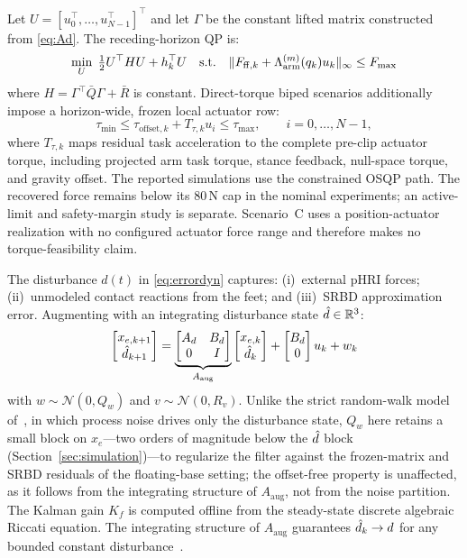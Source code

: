 Let $U=[u_0^\top,\ldots,u_{N-1}^\top]^\top$ and let $\Gamma$ be the
constant lifted matrix constructed from \eqref{eq:Ad}.
The receding-horizon QP is:
\begin{equation}\label{eq:QP}
  \min_U\;\tfrac12U^\top HU+h_k^\top U
  \quad\text{s.t.}\quad
  \|F_{\mathrm{ff},k}+\Lambda_{\text{arm}}^{(m)}(q_k)u_k\|_\infty\leq F_{\max}
\end{equation}
where $H=\Gamma^\top\bar Q\Gamma+\bar R$ is constant. Direct-torque biped
scenarios additionally impose a horizon-wide, frozen local actuator row:
\begin{equation}
  \tau_{\min}\leq\tau_{\mathrm{offset},k}+T_{\tau,k}u_i\leq\tau_{\max},
  \qquad i=0,\ldots,N-1,
\end{equation}
where $T_{\tau,k}$ maps residual task acceleration to the complete pre-clip
actuator torque, including projected arm task torque, stance feedback,
null-space torque, and gravity offset. The reported simulations use the
constrained OSQP path. The recovered force remains below its 80\,N cap in
the nominal experiments; an active-limit and safety-margin study is
separate. Scenario~C uses a position-actuator realization with
no configured actuator force range and therefore makes no torque-feasibility
claim.

The disturbance $d(t)$ in \eqref{eq:errordyn} captures: (i)~external pHRI
forces; (ii)~unmodeled contact reactions from the feet; and (iii)~SRBD
approximation error.
Augmenting with an integrating disturbance state $\hat{d}\in\mathbb{R}^3$:
\begin{equation}\label{eq:augstate}
  \begin{bmatrix}x_{e,k+1}\\\hat{d}_{k+1}\end{bmatrix}
  =\underbrace{\begin{bmatrix}A_d & B_d \\ 0 & I\end{bmatrix}}_{A_{\text{aug}}}
  \begin{bmatrix}x_{e,k}\\\hat{d}_{k}\end{bmatrix}
  +\begin{bmatrix}B_d\\0\end{bmatrix}u_k+w_k
\end{equation}
with $w\sim\mathcal{N}(0,Q_w)$ and $v\sim\mathcal{N}(0,R_v)$.
Unlike the strict random-walk model of~\cite{cao2026impedance}, in which
process noise drives only the disturbance state, $Q_w$ here retains a
small block on $x_e$---two orders of magnitude below the $\hat{d}$
block (Section~\ref{sec:simulation})---to regularize the filter against
the frozen-matrix and SRBD residuals of the floating-base setting; the
offset-free property is unaffected, as it follows from the integrating
structure of $A_{\text{aug}}$, not from the noise partition.
The Kalman gain $K_f$ is computed offline from the steady-state discrete
algebraic Riccati equation.
The integrating structure of $A_{\text{aug}}$ guarantees $\hat{d}_{k}\to d$
for any bounded constant disturbance~\cite{cao2004antiwindup}.

